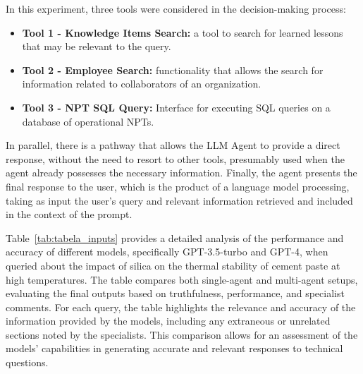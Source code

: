             In this experiment, three tools were considered in the decision-making process:

            \begin{itemize}
            
                
                \item \textbf{Tool 1 - Knowledge Items Search:} a tool to search for learned lessons that may be relevant to the query. 
                \label{Tool1}
        
                \item \label{Tool2} \textbf{Tool 2 - Employee Search:} functionality that allows the search for information related to collaborators of an organization.
        
                \item \label{Tool3} \textbf{Tool 3 - NPT SQL Query:} Interface for executing SQL queries on a database of operational NPTs.    
                
            \end{itemize}

            In parallel, there is a pathway that allows the LLM Agent to provide a direct response, without the need to resort to other tools, presumably used when the agent already possesses the necessary information. 
            Finally, the agent presents the final response to the user, which is the product of a language model processing, taking as input the user's query and relevant information retrieved and included in the context of the prompt.

             Table~\ref{tab:tabela_inputs} provides a detailed analysis of the performance and accuracy of different models, specifically GPT-3.5-turbo and GPT-4, when queried about the impact of silica on the thermal stability of cement paste at high temperatures. 
             The table compares both single-agent and multi-agent setups, evaluating the final outputs based on truthfulness, performance, and specialist comments. 
             For each query, the table highlights the relevance and accuracy of the information provided by the models, including any extraneous or unrelated sections noted by the specialists. 
             This  comparison allows for an  assessment of the models' capabilities in generating accurate and relevant responses to technical questions.

